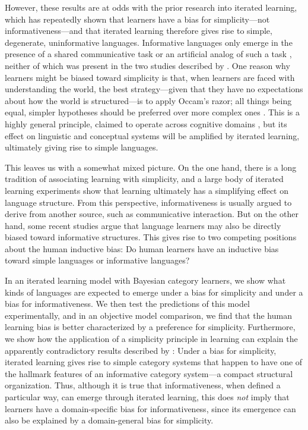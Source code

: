 \documentclass[doc,biblatex]{apa7}
\begin{document}
However, these results are at odds with the prior research into iterated learning, which has repeatedly shown that learners have a bias for simplicity---not informativeness---and that iterated learning therefore gives rise to simple, degenerate, uninformative languages. Informative languages only emerge in the presence of a shared communicative task \parencite[e.g.,][]{Kirby:2015,Carr:2017,Saldana:2019,Motamedi:2019,Winters:2018,Raviv:2018} or an artificial analog of such a task \parencite{Kirby:2008,Beckner:2017}, neither of which was present in the two studies described by \textcite{Carstensen:2015}. One reason why learners might be biased toward simplicity is that, when learners are faced with understanding the world, the best strategy---given that they have no expectations about how the world is structured---is to apply Occam's razor; all things being equal, simpler hypotheses should be preferred over more complex ones \parencite{Solomonoff:1964a,Li:2008,Rissanen:1978}. This is a highly general principle, claimed to operate across cognitive domains \parencite{Chater:2003,Chater:2015,Culbertson:2016,Feldman:2016,Kemp:2012}, but its effect on linguistic and conceptual systems will be amplified by iterated learning, ultimately giving rise to simple languages.

This leaves us with a somewhat mixed picture. On the one hand, there is a long tradition of associating learning with simplicity, and a large body of iterated learning experiments show that learning ultimately has a simplifying effect on language structure. From this perspective, informativeness is usually argued to derive from another source, such as communicative interaction. But on the other hand, some recent studies argue that language learners may also be directly biased toward informative structures. This gives rise to two competing positions about the human inductive bias: Do human learners have an inductive bias toward simple languages or informative languages?

In an iterated learning model with Bayesian category learners, we show what kinds of languages are expected to emerge under a bias for simplicity and under a bias for informativeness. We then test the predictions of this model experimentally, and in an objective model comparison, we find that the human learning bias is better characterized by a preference for simplicity. Furthermore, we show how the application of a simplicity principle in learning can explain the apparently contradictory results described by \textcite{Carstensen:2015}: Under a bias for simplicity, iterated learning gives rise to simple category systems that happen to have one of the hallmark features of an informative category system---a compact structural organization. Thus, although it is true that informativeness, when defined a particular way, can emerge through iterated learning, this does \textit{not} imply that learners have a domain-specific bias for informativeness, since its emergence can also be explained by a domain-general bias for simplicity.
\end{document}
